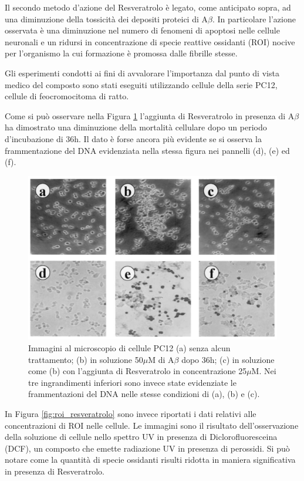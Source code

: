 \documentclass[a4paper, 12pt]{article}
\begin{document}
Il secondo metodo d'azione del Resveratrolo è legato, come anticipato sopra, ad una diminuzione della tossicità dei depositi proteici di A$\beta$. In particolare l'azione osservata è una diminuzione nel numero di fenomeni di  apoptosi nelle cellule neuronali e un ridursi in concentrazione di specie reattive ossidanti (ROI) nocive per l'organismo la cui formazione è promossa dalle fibrille stesse.

Gli esperimenti condotti ai fini di avvalorare l'importanza dal punto di vista medico del composto sono stati eseguiti utilizzando cellule della serie PC12, cellule di feocromocitoma di ratto.

Come si può osservare nella Figura \ref{fig:apo_resveratrolo} l'aggiunta di Resveratrolo in presenza di A$\beta$ ha dimostrato una diminuzione della mortalità cellulare dopo un periodo d'incubazione di 36h. Il dato è forse ancora più evidente se si osserva la frammentazione del DNA evidenziata nella stessa figura nei pannelli (d), (e) ed (f).

\begin{figure}[H]
	\centering
	\includegraphics[width=\linewidth]{immagini/apo_resveratrolo.png}
	\caption{Immagini al microscopio di cellule PC12 (a) senza alcun trattamento; (b) in soluzione 50$\mu$M di A$\beta$ dopo 36h; (c) in soluzione come (b) con l'aggiunta di Resveratrolo in concentrazione 25$\mu$M. Nei tre ingrandimenti inferiori sono invece state evidenziate le frammentazioni del DNA nelle stesse condizioni di (a), (b) e (c).}
	\label{fig:apo_resveratrolo}
\end{figure}

In Figura \ref{fig:roi_resveratrolo} sono invece riportati i dati relativi alle concentrazioni di ROI nelle cellule. Le immagini sono il risultato dell'osservazione della soluzione di cellule nello spettro UV in presenza di Diclorofluoresceina (DCF), un composto che emette radiazione UV in presenza di perossidi. Si può notare come la quantità di specie ossidanti risulti ridotta in maniera significativa in presenza di Resveratrolo. \cite{jang_protective_2003}
\end{document}
